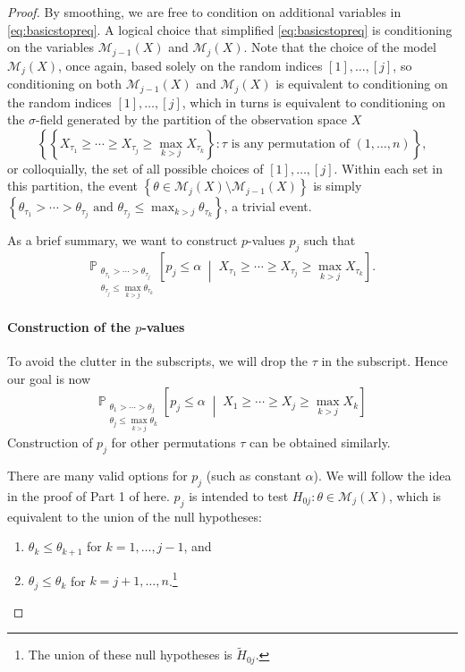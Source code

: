 \documentclass[11pt]{article}
\theoremstyle{definition}
\theoremstyle{custom}
\newcommand{\PP}{\mathbb{P}}
\begin{document}
\begin{proof}
By smoothing, we are free to condition on additional variables in \eqref{eq:basicstopreq}. A logical choice that simplified \eqref{eq:basicstopreq} is conditioning on the variables $\mathcal{M}_{j-1}\left(X\right)$ and $\mathcal{M}_j\left(X\right)$. Note that the choice of the model $\mathcal{M}_j\left(X\right)$, once again, based solely on the random indices $[1], \ldots, [j]$, so conditioning on both $\mathcal{M}_{j-1}\left(X\right)$ and $\mathcal{M}_j\left(X\right)$ is equivalent to conditioning on the random indices $[1], \ldots, [j]$, which in turns is equivalent to conditioning on the $\sigma$-field generated by the partition of the observation space $X$
$$\left\{\left\{X_{\tau_1} \ge \cdots \ge X_{\tau_j} \ge \max_{k>j} X_{\tau_k}\right\}: \tau \text{ is any permutation of } \left(1, \ldots, n\right)\right\},$$
or colloquially, the set of all possible choices of $[1], \ldots, [j]$. Within each set in this partition, the event $\left\{\theta \in \mathcal{M}_j\left(X\right) \setminus \mathcal{M}_{j-1}\left(X\right)\right\}$ is simply $\left\{\theta_{\tau_1} > \cdots > \theta_{\tau_j} \text { and } \theta_{\tau_j} \le \max_{k>j} \theta_{\tau_k}\right\}$, a trivial event.

As a brief summary, we want to construct $p$-values $p_j$ such that
$$\PP_{\substack{\theta_{\tau_1} > \cdots > \theta_{\tau_j} \\ \theta_{\tau_j} \le \max_{k>j} \theta_{\tau_k}}} \left[p_j \le \alpha \;\middle|\; X_{\tau_1} \ge \cdots \ge X_{\tau_j} \ge \max_{k>j} X_{\tau_k}\right].$$

\paragraph{Construction of the $p$-values}

To avoid the clutter in the subscripts, we will drop the $\tau$ in the subscript. Hence our goal is now
$$\PP_{\substack{\theta_1 > \cdots > \theta_j \\ \theta_j \le \max_{k>j} \theta_k}} \left[p_j \le \alpha \;\middle|\; X_1 \ge \cdots \ge X_j \ge \max_{k>j} X_k\right]$$
Construction of $p_j$ for other permutations $\tau$ can be obtained similarly.

There are many valid options for $p_j$ (such as constant $\alpha$). We will follow the idea in the proof of Part 1 of  here. $p_j$ is intended to test $H_{0j}: \theta \in \mathcal{M}_j\left(X\right)$, which is equivalent to the union of the null hypotheses:
\begin{enumerate}
\item $\theta_k \le \theta_{k+1}$ for $k = 1, \ldots, j-1$, and
\item $\theta_j \le \theta_k$ for $k = j+1, \ldots, n$.\footnote{The union of these null hypotheses is $\widetilde{H}_{0j}$.}
\end{enumerate}


\end{proof}
\end{document}
